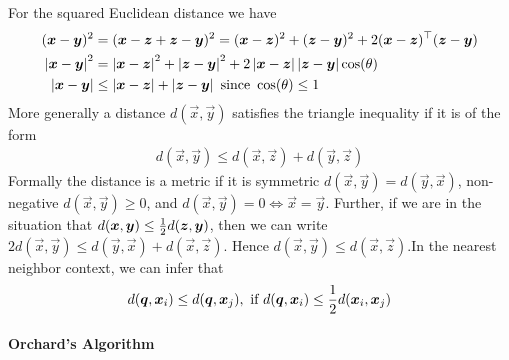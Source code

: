 For the squared Euclidean distance we have
\begin{align*}
	(\vec{x}-\vec{y})^2&=(\vec{x}-\vec{z}+\vec{z}-\vec{y})^2=(\vec{x}-\vec{z})^2+(\vec{z}-\vec{y})^2+2(\vec{x}-\vec{z})\T(\vec{z}-\vec{y}) \\
	\ab{\vec{x}-\vec{y}}^2&=\ab{\vec{x}-\vec{z}}^2+\ab{\vec{z}-\vec{y}}^2+2\ab{\vec{x}-\vec{z}}\ab{\vec{z}-\vec{y}}\cos(\th) \\
	\ab{\vec{x}-\vec{y}}&\leq\ab{\vec{x}-\vec{z}}+\ab{\vec{z}-\vec{y}}\ \text{since}\  \cos(\th)\leq 1
\end{align*}
More generally a distance $d(\vec{x},\vec{y})$ satisfies the triangle inequality if it is of the form
\begin{align*}
	d(\vec{x},\vec{y})\leq d(\vec{x},\vec{z})+d(\vec{y},\vec{z})
\end{align*}
Formally the distance is a metric if it is symmetric $d(\vec{x},\vec{y})=d(\vec{y},\vec{x})$, non-negative $d(\vec{x},\vec{y})\geq 0$, and $d(\vec{x},\vec{y})=0\iff\vec{x}=\vec{y}$. Further, if we are in the situation that $d(\boldsymbol{x},\boldsymbol{y})\leq\frac{1}{2} d(\boldsymbol{z},\boldsymbol{y})$, then we can write $2d(\vec{x},\vec{y})\leq d(\vec{y},\vec{x})+d(\vec{x},\vec{z})$. Hence $d(\vec{x},\vec{y})\leq d(\vec{x},\vec{z})$.In the nearest neighbor context, we can infer that
\begin{align*}
	d(\vec{q},\vec{x}_i)\leq d(\vec{q},\vec{x}_j),\ \text{if}\ d(\vec{q},\vec{x}_i)\leq\half d(\vec{x}_i,\vec{x}_j)
\end{align*}

\paragraph{Orchard's Algorithm}

